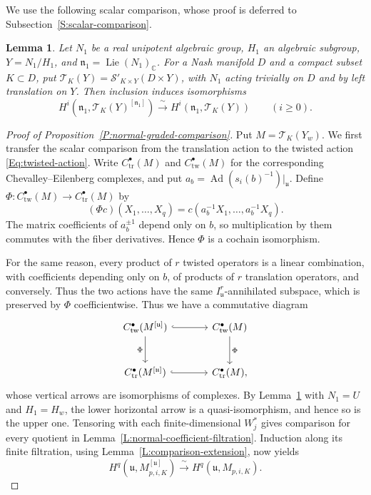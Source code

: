 \documentclass[a4paper,12pt]{amsart}
\numberwithin{equation}{section}
\theoremstyle{plain}
\newtheorem{lemma}[theorem]{Lemma}
\theoremstyle{definition}
\theoremstyle{remark}
\begin{document}
We use the following scalar comparison, whose proof is deferred to Subsection~\ref{S:scalar-comparison}.

\begin{lemma}\label{L:scalar-parameter-comparison}
Let $N_1$ be a real unipotent algebraic group, $H_1$ an algebraic subgroup, $Y=N_1/H_1$, and $\mathfrak n_1=\operatorname{Lie}(N_1)_{\mathbb C}$.
For a Nash manifold $D$ and a compact subset $K\subset D$, put $\mathcal T_K(Y)=\mathcal S'_{K\times Y}(D\times Y)$, with $N_1$ acting trivially on $D$ and by left translation on $Y$.
Then inclusion induces isomorphisms
\[
 H^i(\mathfrak n_1,\mathcal T_K(Y)^{[\mathfrak n_1]})
 \xrightarrow{\ \sim\ }H^i(\mathfrak n_1,\mathcal T_K(Y))
 \qquad(i\geq0).
\]
\end{lemma}

\begin{proof}[Proof of Proposition~\ref{P:normal-graded-comparison}]
Put $M=\mathcal T_K(Y_w)$.
We first transfer the scalar comparison from the translation action to the twisted action \eqref{Eq:twisted-action}.
Write $C^\bullet_{\mathrm{tr}}(M)$ and $C^\bullet_{\mathrm{tw}}(M)$ for the corresponding Chevalley--Eilenberg complexes, and put $a_b=\operatorname{Ad}(s_i(b)^{-1})|_{\mathfrak u}$.
Define $\Phi:C^\bullet_{\mathrm{tw}}(M)\to C^\bullet_{\mathrm{tr}}(M)$ by
\begin{equation}\label{Eq:cochain-untwisting}
 (\Phi c)(X_1,\ldots,X_q)
       =c(a_b^{-1}X_1,\ldots,a_b^{-1}X_q).
\end{equation}
The matrix coefficients of $a_b^{\pm1}$ depend only on $b$, so multiplication by them commutes with the fiber derivatives.
Hence $\Phi$ is a cochain isomorphism.

For the same reason, every product of $r$ twisted operators is a linear combination, with coefficients depending only on $b$, of products of $r$ translation operators, and conversely.
Thus the two actions have the same $I_{\mathfrak u}^r$-annihilated subspace, which is preserved by $\Phi$ coefficientwise.
Thus we have a commutative diagram
\[
\begin{tikzcd}[column sep=large, row sep=large]
 C^\bullet_{\mathrm{tw}}(M^{[\mathfrak u]}) \arrow[r,hook] \arrow[d,"\Phi"']
 & C^\bullet_{\mathrm{tw}}(M) \arrow[d,"\Phi"] \\
 C^\bullet_{\mathrm{tr}}(M^{[\mathfrak u]}) \arrow[r,hook]
 & C^\bullet_{\mathrm{tr}}(M),
\end{tikzcd}
\]
whose vertical arrows are isomorphisms of complexes.
By Lemma~\ref{L:scalar-parameter-comparison} with $N_1=U$ and $H_1=H_w$, the lower horizontal arrow is a quasi-isomorphism, and hence so is the upper one.
Tensoring with each finite-dimensional $W_j^*$ gives comparison for every quotient in Lemma~\ref{L:normal-coefficient-filtration}.
Induction along its finite filtration, using Lemma~\ref{L:comparison-extension}, now yields
\begin{equation}\label{Eq:local-normal-comparison}
 H^q(\mathfrak u,M_{p,i,K}^{[\mathfrak u]})
 \xrightarrow{\ \sim\ }H^q(\mathfrak u,M_{p,i,K}).
\end{equation}


\end{proof}
\end{document}
